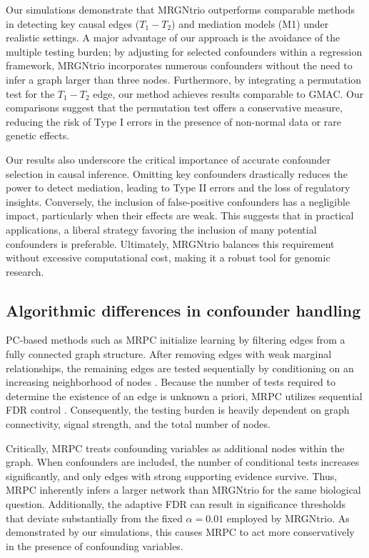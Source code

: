 \documentclass[12pt,letterpaper]{report}
\begin{document}
\begin{doublespace}
Our simulations demonstrate that MRGNtrio outperforms comparable methods in detecting key causal edges ($T_1 - T_2$) and mediation models (M1) under realistic settings. A major advantage of our approach is the avoidance of the multiple testing burden; by adjusting for selected confounders within a regression framework, MRGNtrio incorporates numerous confounders without the need to infer a graph larger than three nodes. Furthermore, by integrating a permutation test for the $T_1 - T_2$ edge, our method achieves results comparable to GMAC. Our comparisons suggest that the permutation test offers a conservative measure, reducing the risk of Type I errors in the presence of non-normal data or rare genetic effects.

Our results also underscore the critical importance of accurate confounder selection in causal inference. Omitting key confounders drastically reduces the power to detect mediation, leading to Type II errors and the loss of regulatory insights. Conversely, the inclusion of false-positive confounders has a negligible impact, particularly when their effects are weak. This suggests that in practical applications, a liberal strategy favoring the inclusion of many potential confounders is preferable. Ultimately, MRGNtrio balances this requirement without excessive computational cost, making it a robust tool for genomic research.

\subsection{Algorithmic differences in confounder handling}

PC-based methods such as MRPC initialize learning by filtering edges from a fully connected graph structure. After removing edges with weak marginal relationships, the remaining edges are tested sequentially by conditioning on an increasing neighborhood of nodes \cite{badsha2019learning, spirtes2000causation}. Because the number of tests required to determine the existence of an edge is unknown a priori, MRPC utilizes sequential FDR control \cite{tian2019addis}. Consequently, the testing burden is heavily dependent on graph connectivity, signal strength, and the total number of nodes.

Critically, MRPC treats confounding variables as additional nodes within the graph. When confounders are included, the number of conditional tests increases significantly, and only edges with strong supporting evidence survive. Thus, MRPC inherently infers a larger network than MRGNtrio for the same biological question. Additionally, the adaptive FDR can result in significance thresholds that deviate substantially from the fixed $\alpha = 0.01$ employed by MRGNtrio. As demonstrated by our simulations, this causes MRPC to act more conservatively in the presence of confounding variables.


\end{doublespace}
\end{document}
